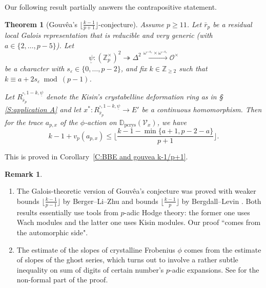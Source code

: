 \documentclass[12pt]{amsart}
\newtheorem{theorem}[subsection]{Theorem}
\theoremstyle{definition}
\newtheorem{remark}[subsection]{Remark}
\numberwithin{equation}{subsection}
\def\calO{\mathcal{O}}
\def\calV{\mathcal{V}}
\def\DD{\mathbb{D}}
\def\ZZ{\mathbb{Z}}
\newcommand{\pcrys}{\mathrm{pcrys}}
\begin{document}
Our following result partially answers the contrapositive statement.
\begin{theorem}[Gouv\^ea's $\big\lfloor\frac{k-1}{p+1}\big\rfloor$-conjecture]
\label{T:Gouvea k-1/p+1}
Assume $p\geq 11$.
Let $\bar r_p$ be a residual local Galois representation that is reducible and very generic (with $a \in \{2,\dots, p-5\}$).
Let $$\underline \psi: (\ZZ_p^\times)^2 \twoheadrightarrow \Delta^2 \xrightarrow{ \omega^{-s_\varepsilon} \times \omega^{-s_\varepsilon}} \calO^\times$$ 
be a character with $s_\varepsilon \in \{0, \dots, p-2\}$, and fix $k \in \ZZ_{\geq 2}$ such that $k \equiv a+ 2s_\varepsilon\bmod(p-1)$.

Let $R_{\bar r_p}^{\square,1-k, \underline \psi}$ denote the Kisin's crystabelline deformation ring as in \S\,\ref{S:application A} and let $x^*: R_{\bar r_p}^{\square,1-k, \underline \psi} \to E'$ be a continuous homomorphism. Then for the trace $a_{p, x}$ of the $\phi$-action on $\DD_\pcrys(\calV_x)$, we have
$$
k-1+v_p(a_{p, x}) \leq \Big\lfloor\frac{k-1- \min\{a+1, p-2-a\}}{p+1}\Big\rfloor.
$$
\end{theorem}

This is proved in Corollary~\ref{C:BBE and gouvea k-1/p+1}.

\begin{remark}
\label{R:k-1/p+1}
\begin{enumerate}
\item The Galois-theoretic version of Gouv\^ea's conjecture was proved with weaker bounds $\big\lfloor \frac{k-1}{p-1}\big\rfloor$ by Berger--Li--Zhu \cite{berger-li-zhu} and bounds $\big\lfloor \frac{k-1}{p}\big\rfloor$ by Bergdall--Levin \cite{bergdall-levin}. Both results essentially use tools from $p$-adic Hodge theory: the former one uses Wach modules and the latter one uses Kisin modules.  Our proof ``comes from the automorphic side".

\item The estimate of the slopes of crystalline Frobenius $\phi$ comes from the estimate of slopes of the ghost series, which turns out to involve a rather subtle inequality on sum of digits of certain number's $p$-adic expansions. See \cite[Proposition~4.28]{liu-truong-xiao-zhao} for the non-formal part of the proof.
\end{enumerate}
\end{remark}
\end{document}
